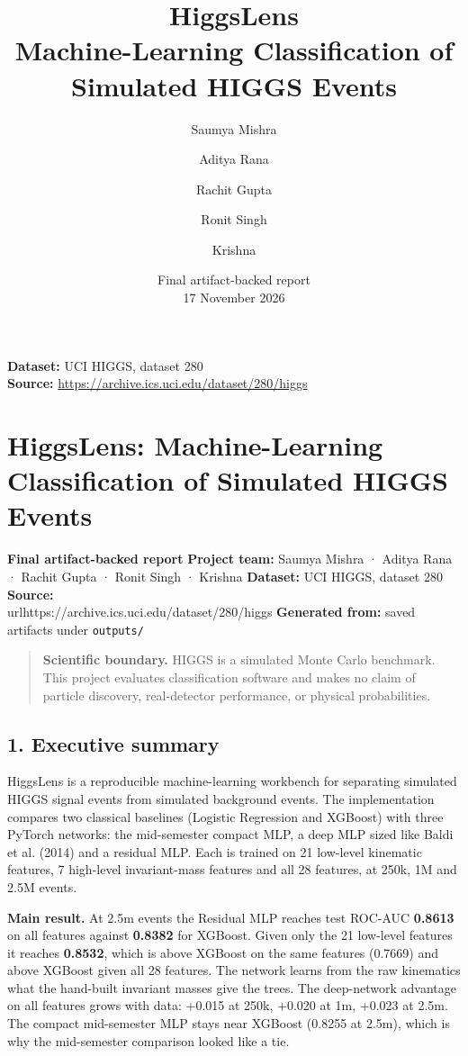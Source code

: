 \documentclass[11pt,a4paper,oneside]{report}
\title{\Huge HiggsLens\\[0.4em]\Large Machine-Learning Classification of Simulated HIGGS Events}
\author{Saumya Mishra \and Aditya Rana \and Rachit Gupta \and Ronit Singh \and Krishna}
\date{Final artifact-backed report\\17 November 2026}
\begin{document}
\maketitle
\begin{center}
\textbf{Dataset:} UCI HIGGS, dataset 280\\
\textbf{Source:} \url{https://archive.ics.uci.edu/dataset/280/higgs}
\end{center}
\tableofcontents
\clearpage
\chapter{HiggsLens: Machine-Learning Classification of Simulated HIGGS Events}

\textbf{Final artifact-backed report}   \textbf{Project team:} Saumya Mishra · Aditya Rana · Rachit Gupta · Ronit Singh · Krishna   \textbf{Dataset:} UCI HIGGS, dataset 280   \textbf{Source:} \\url{https://archive.ics.uci.edu/dataset/280/higgs}   \textbf{Generated from:} saved artifacts under \texttt{outputs/}

\begin{quote}\textbf{Scientific boundary.} HIGGS is a simulated Monte Carlo benchmark. This project evaluates classification software and makes no claim of particle discovery, real-detector performance, or physical probabilities.\end{quote}

\section{1. Executive summary}

HiggsLens is a reproducible machine-learning workbench for separating simulated HIGGS signal events from simulated background events. The implementation compares two classical baselines (Logistic Regression and XGBoost) with three PyTorch networks: the mid-semester compact MLP, a deep MLP sized like Baldi et al. (2014) and a residual MLP. Each is trained on 21 low-level kinematic features, 7 high-level invariant-mass features and all 28 features, at 250k, 1M and 2.5M events.

\textbf{Main result.} At 2.5m events the Residual MLP reaches test ROC-AUC \textbf{0.8613} on all features against \textbf{0.8382} for XGBoost.  Given only the 21 low-level features it reaches \textbf{0.8532}, which is above XGBoost on the same features (0.7669) and above XGBoost given all 28 features.  The network learns from the raw kinematics what the hand-built invariant masses give the trees. The deep-network advantage on all features grows with data: +0.015 at 250k, +0.020 at 1m, +0.023 at 2.5m. The compact mid-semester MLP stays near XGBoost (0.8255 at 2.5m), which is why the mid-semester comparison looked like a tie. 
\end{document}
